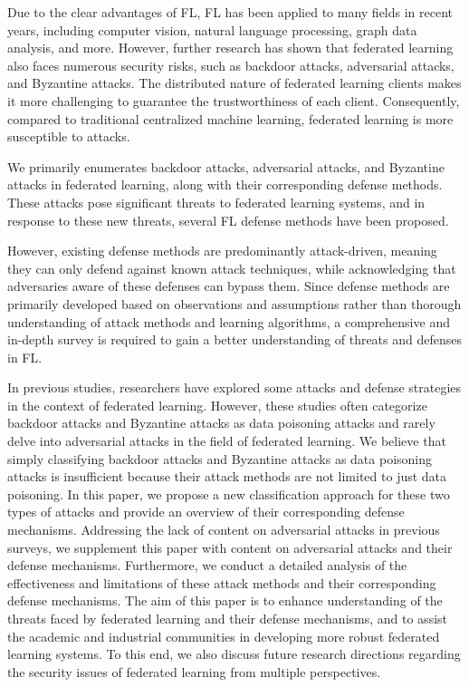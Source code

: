 \documentclass[conference]{IEEEtran}
\begin{document}
Due to the clear advantages of FL, 
FL has been applied to many fields in recent years, 
including computer vision\cite{b5,b6}, natural language processing\cite{b7,b8}, 
graph data analysis\cite{b9,b10}, and more.
However, further research has shown that federated learning 
also faces numerous security risks, 
such as backdoor attacks, adversarial attacks, and Byzantine attacks. 
The distributed nature of federated learning clients 
makes it more challenging to guarantee 
the trustworthiness of each client. 
Consequently, compared to traditional centralized machine learning, 
federated learning is more susceptible to attacks.

We primarily enumerates backdoor attacks, adversarial attacks, 
and Byzantine attacks in federated learning, 
along with their corresponding defense methods. 
These attacks pose significant threats to federated learning systems, 
and in response to these new threats, several FL defense methods have been proposed.

However, existing defense methods are predominantly attack-driven, 
meaning they can only defend against known attack techniques, 
while acknowledging that adversaries aware of these defenses can bypass them. 
Since defense methods are primarily developed based on observations 
and assumptions rather than thorough understanding of attack methods 
and learning algorithms, 
a comprehensive and in-depth survey is required to gain a better understanding of 
threats and defenses in FL.

In previous studies\cite{b11,b12,b13,b14,b15}, 
researchers have explored some attacks and defense strategies in the context 
of federated learning. 
However, these studies often categorize backdoor attacks 
and Byzantine attacks as data poisoning attacks and 
rarely delve into adversarial attacks in the field of federated learning. 
We believe that simply classifying backdoor attacks and Byzantine attacks 
as data poisoning attacks is insufficient 
because their attack methods are not limited to just data poisoning.
In this paper, we propose a new classification approach for these two 
types of attacks and provide an overview of their corresponding defense mechanisms. 
Addressing the lack of content on adversarial attacks in previous surveys, 
we supplement this paper with content on adversarial attacks and their defense 
mechanisms. 
Furthermore, we conduct a detailed analysis of the effectiveness and limitations 
of these attack methods and their corresponding defense mechanisms. 
The aim of this paper is to enhance understanding of the threats faced 
by federated learning and their defense mechanisms, 
and to assist the academic and industrial communities in 
developing more robust federated learning systems. 
To this end, we also discuss future research directions 
regarding the security issues of federated learning from multiple perspectives.
\end{document}
